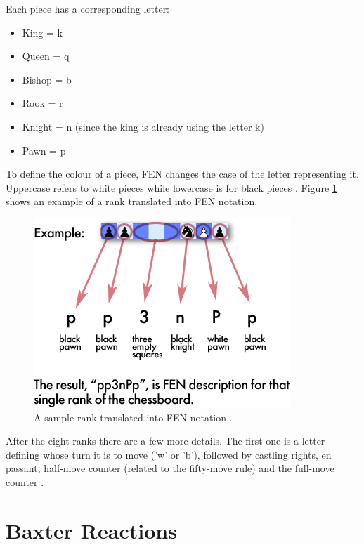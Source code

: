 \documentclass{l4proj}
\begin{document}
Each piece has a corresponding letter:

\begin{itemize}

	\item King = k
	\item Queen = q
	\item Bishop = b
	\item Rook = r
	\item Knight = n (since the king is already using the letter k)
	\item Pawn = p

\end{itemize}


To define the colour of a piece, FEN changes the case of the letter representing it. Uppercase refers to white pieces while lowercase is for black pieces \cite{FENNotation}. Figure \ref{FENRankExample} shows an example of a rank translated into FEN notation.

\begin{figure}[h!]
\centering
\includegraphics[scale=0.8]{fenhelp2.png}
\caption{A sample rank translated into FEN notation \cite{FENNotation}.}
\label{FENRankExample}
\end{figure}

After the eight ranks there are a few more details. The first one is a letter defining whose turn it is to move ('w' or 'b'), followed by castling rights, en passant, half-move counter (related to the fifty-move rule) and the full-move counter \cite{FEN2}.

\pagebreak
\vspace*{30mm}
\section{Baxter Reactions} \label{BaxterReactions}
\end{document}
